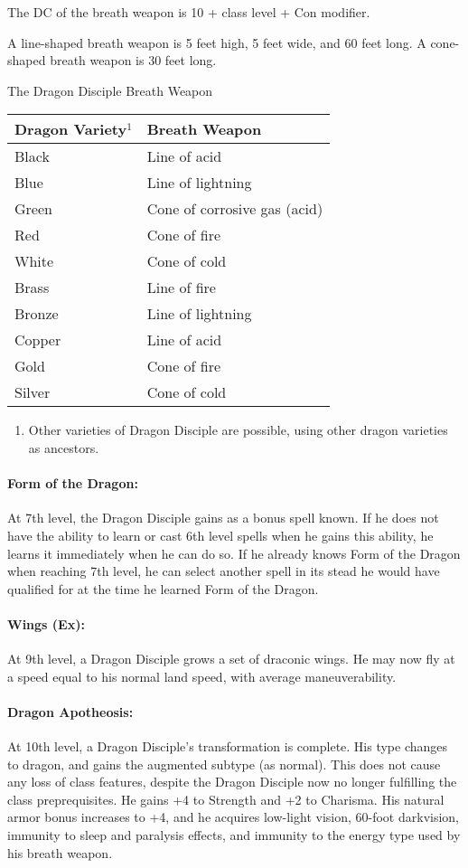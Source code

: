 The DC of the breath weapon is 10 + class level + Con modifier.

A line-shaped breath weapon is 5 feet high, 5 feet wide, and 60 feet long. A cone-shaped breath weapon is 30 feet long.

\begin{tableonecolumn}
\caption{The Dragon Disciple Breath Weapon}
\label{tab:DragonDiscipleBreathWeapon}
\begin{tabular}{ll}
\toprule
Dragon Variety$^1$&Breath Weapon\\
\midrule
Black		&Line of acid\\
Blue		&Line of lightning\\
Green		&Cone of corrosive gas (acid)\\
Red		&Cone of fire\\
White		&Cone of cold\\
Brass		&Line of fire\\
Bronze		&Line of lightning\\
Copper		&Line of acid\\
Gold		&Cone of fire\\
Silver		&Cone of cold\\
\bottomrule
\end{tabular}
\begin{enumerate}
 \item Other varieties of Dragon Disciple are possible, using other dragon varieties as ancestors.
\end{enumerate}
\end{tableonecolumn}

\paragraph{Form of the Dragon:}
At 7th level, the Dragon Disciple gains  as a bonus spell known.
If he does not have the ability to learn or cast 6th level spells when he gains this ability, he learns it immediately when he can do so.
If he already knows Form of the Dragon when reaching 7th level, he can select another spell in its stead he would have qualified for at the time he learned Form of the Dragon.
\paragraph{Wings (Ex):}
At 9th level, a Dragon Disciple grows a set of draconic wings. 
He may now fly at a speed equal to his normal land speed, with average maneuverability.
\paragraph{Dragon Apotheosis:}
At 10th level, a Dragon Disciple's transformation is complete. His type changes to dragon, and gains the augmented subtype (as normal).
This does not cause any loss of class features, despite the Dragon Disciple now no longer fulfilling the class preprequisites.
He gains +4 to Strength and +2 to Charisma.
His natural armor bonus increases to +4, and he acquires low-light vision, 60-foot darkvision, immunity to sleep and paralysis effects, and immunity to the energy type used by his breath weapon.